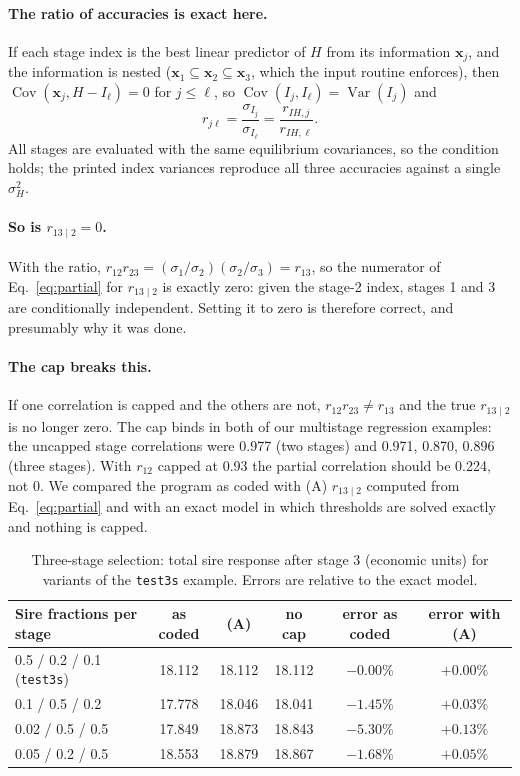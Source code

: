 \documentclass[11pt]{article}
\newcommand{\src}[1]{\texttt{#1}}
\newcommand{\ve}[1]{\boldsymbol{#1}}
\newcommand{\Cov}{\operatorname{Cov}}
\newcommand{\Var}{\operatorname{Var}}
\begin{document}
\paragraph{The ratio of accuracies is exact here.} If each stage index is the best linear predictor of $H$ from its information $\ve x_j$, and the information is nested ($\ve x_1\subseteq\ve x_2\subseteq\ve x_3$, which the input routine enforces), then $\Cov(\ve x_j,H-I_\ell)=0$ for $j\le\ell$, so $\Cov(I_j,I_\ell)=\Var(I_j)$ and
\[
r_{j\ell}=\frac{\sigma_{I_j}}{\sigma_{I_\ell}}=\frac{r_{IH,j}}{r_{IH,\ell}} .
\]
All stages are evaluated with the same equilibrium covariances, so the condition holds; the printed index variances reproduce all three accuracies against a single $\sigma_H^2$.

\paragraph{So is $r_{13\mid2}=0$.} With the ratio, $r_{12}r_{23}=(\sigma_1/\sigma_2)(\sigma_2/\sigma_3)=r_{13}$, so the numerator of Eq.~\eqref{eq:partial} for $r_{13\mid2}$ is exactly zero: given the stage-2 index, stages 1 and 3 are conditionally independent. Setting it to zero is therefore correct, and presumably why it was done.

\paragraph{The cap breaks this.} If one correlation is capped and the others are not, $r_{12}r_{23}\ne r_{13}$ and the true $r_{13\mid2}$ is no longer zero. The cap binds in both of our multistage regression examples: the uncapped stage correlations were 0.977 (two stages) and 0.971, 0.870, 0.896 (three stages). With $r_{12}$ capped at 0.93 the partial correlation should be 0.224, not 0. We compared the program as coded with (A) $r_{13\mid2}$ computed from Eq.~\eqref{eq:partial} and with an exact model in which thresholds are solved exactly and nothing is capped.

\begin{table}[ht]
\centering\small
\caption{Three-stage selection: total sire response after stage 3 (economic units) for variants of the \src{test3s} example. Errors are relative to the exact model.}\label{tab:stage3}
\begin{tabular}{lccccc}\toprule
Sire fractions per stage & as coded & (A) & no cap & error as coded & error with (A)\\\midrule
0.5 / 0.2 / 0.1 (\src{test3s}) & 18.112 & 18.112 & 18.112 & $-0.00\%$ & $+0.00\%$\\
0.1 / 0.5 / 0.2 & 17.778 & 18.046 & 18.041 & $-1.45\%$ & $+0.03\%$\\
0.02 / 0.5 / 0.5 & 17.849 & 18.873 & 18.843 & $-5.30\%$ & $+0.13\%$\\
0.05 / 0.2 / 0.5 & 18.553 & 18.879 & 18.867 & $-1.68\%$ & $+0.05\%$\\\bottomrule
\end{tabular}
\end{table}
\end{document}
